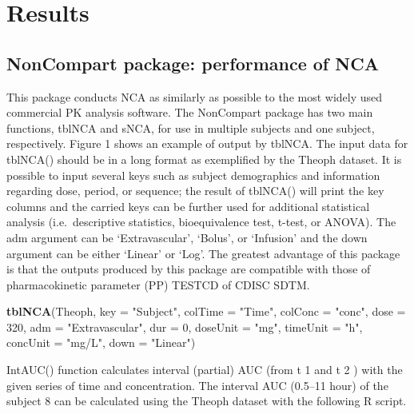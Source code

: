 \documentclass[12pt,]{krantz}
\newenvironment{Shaded}{\begin{snugshade}}{\end{snugshade}}
\newcommand{\DataTypeTok}[1]{\textcolor[rgb]{0.13,0.29,0.53}{#1}}
\newcommand{\DecValTok}[1]{\textcolor[rgb]{0.00,0.00,0.81}{#1}}
\newcommand{\KeywordTok}[1]{\textcolor[rgb]{0.13,0.29,0.53}{\textbf{#1}}}
\newcommand{\NormalTok}[1]{#1}
\newcommand{\StringTok}[1]{\textcolor[rgb]{0.31,0.60,0.02}{#1}}
\theoremstyle{definition}
\theoremstyle{definition}
\theoremstyle{definition}
\theoremstyle{remark}
\begin{document}
\hypertarget{results}{%
\chapter{Results}\label{results}}

\hypertarget{noncompart-package-performance-of-nca}{%
\section{NonCompart package: performance of
NCA}\label{noncompart-package-performance-of-nca}}

This package conducts NCA as similarly as possible to the most widely
used commercial PK analysis software. The NonCompart package has two
main functions, tblNCA and sNCA, for use in multiple subjects and one
subject, respectively. Figure 1 shows an example of output by tblNCA.
The input data for tblNCA() should be in a long format as exemplified by
the Theoph dataset. It is possible to input several keys such as subject
demographics and information regarding dose, period, or sequence; the
result of tblNCA() will print the key columns and the carried keys can
be further used for additional statistical analysis (i.e.~descriptive
statistics, bioequivalence test, t-test, or ANOVA). The adm argument can
be `Extravascular', `Bolus', or `Infusion' and the down argument can be
either `Linear' or `Log'. The greatest advantage of this package is that
the outputs produced by this package are compatible with those of
pharmacokinetic parameter (PP) TESTCD of CDISC SDTM.

\begin{Shaded}
\begin{Highlighting}[]
\KeywordTok{tblNCA}\NormalTok{(Theoph, }\DataTypeTok{key =} \StringTok{"Subject"}\NormalTok{, }\DataTypeTok{colTime =} \StringTok{"Time"}\NormalTok{, }\DataTypeTok{colConc =} \StringTok{"conc"}\NormalTok{, }\DataTypeTok{dose =} \DecValTok{320}\NormalTok{, }
       \DataTypeTok{adm =} \StringTok{"Extravascular"}\NormalTok{, }\DataTypeTok{dur =} \DecValTok{0}\NormalTok{, }\DataTypeTok{doseUnit =} \StringTok{"mg"}\NormalTok{, }\DataTypeTok{timeUnit =} \StringTok{"h"}\NormalTok{, }\DataTypeTok{concUnit =} \StringTok{"mg/L"}\NormalTok{, }
       \DataTypeTok{down =} \StringTok{"Linear"}\NormalTok{)}
\end{Highlighting}
\end{Shaded}

IntAUC() function calculates interval (partial) AUC (from t 1 and t 2 )
with the given series of time and concentration. The interval AUC
(0.5--11 hour) of the subject 8 can be calculated using the Theoph
dataset with the following R script.
\end{document}
